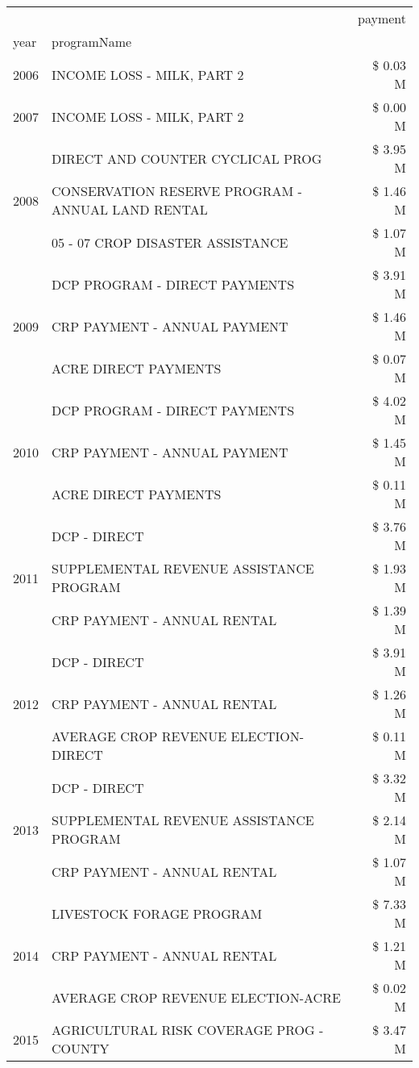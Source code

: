 \begin{tabular}{llr}
\toprule
 &  & payment \\
year & programName &  \\
\midrule
2006 & INCOME LOSS - MILK, PART 2 & \$ 0.03 M \\
\cline{1-3}
2007 & INCOME LOSS - MILK, PART 2 & \$ 0.00 M \\
\cline{1-3}
\multirow[t]{3}{*}{2008} & DIRECT AND COUNTER CYCLICAL PROG & \$ 3.95 M \\
 & CONSERVATION RESERVE PROGRAM - ANNUAL LAND RENTAL & \$ 1.46 M \\
 & 05 - 07 CROP DISASTER ASSISTANCE & \$ 1.07 M \\
\cline{1-3}
\multirow[t]{3}{*}{2009} & DCP PROGRAM - DIRECT PAYMENTS & \$ 3.91 M \\
 & CRP PAYMENT - ANNUAL PAYMENT & \$ 1.46 M \\
 & ACRE DIRECT PAYMENTS & \$ 0.07 M \\
\cline{1-3}
\multirow[t]{3}{*}{2010} & DCP PROGRAM - DIRECT PAYMENTS & \$ 4.02 M \\
 & CRP PAYMENT - ANNUAL PAYMENT & \$ 1.45 M \\
 & ACRE DIRECT PAYMENTS & \$ 0.11 M \\
\cline{1-3}
\multirow[t]{3}{*}{2011} & DCP - DIRECT & \$ 3.76 M \\
 & SUPPLEMENTAL REVENUE ASSISTANCE PROGRAM & \$ 1.93 M \\
 & CRP PAYMENT - ANNUAL RENTAL & \$ 1.39 M \\
\cline{1-3}
\multirow[t]{3}{*}{2012} & DCP - DIRECT & \$ 3.91 M \\
 & CRP PAYMENT - ANNUAL RENTAL & \$ 1.26 M \\
 & AVERAGE CROP REVENUE ELECTION-DIRECT & \$ 0.11 M \\
\cline{1-3}
\multirow[t]{3}{*}{2013} & DCP - DIRECT & \$ 3.32 M \\
 & SUPPLEMENTAL REVENUE ASSISTANCE PROGRAM & \$ 2.14 M \\
 & CRP PAYMENT - ANNUAL RENTAL & \$ 1.07 M \\
\cline{1-3}
\multirow[t]{3}{*}{2014} & LIVESTOCK FORAGE PROGRAM & \$ 7.33 M \\
 & CRP PAYMENT - ANNUAL RENTAL & \$ 1.21 M \\
 & AVERAGE CROP REVENUE ELECTION-ACRE & \$ 0.02 M \\
\cline{1-3}
\multirow[t]{3}{*}{2015} & AGRICULTURAL RISK COVERAGE PROG - COUNTY & \$ 3.47 M \\

\end{tabular}
